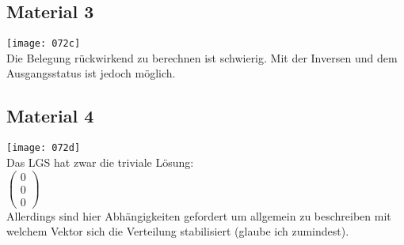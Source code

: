 \documentclass{article}
\begin{document}
	\subsection*{Material 3}
	\texttt{[image: 072c]} \\
	Die Belegung rückwirkend zu berechnen ist schwierig. Mit der Inversen und dem Ausgangsstatus ist jedoch möglich.
	\subsection*{Material 4}
	\texttt{[image: 072d]} \\
	Das LGS hat zwar die triviale Lösung: \\
	$\left(\begin{array}{c}
	0 \\ 0 \\ 0
	\end{array}\right)$ \\
	Allerdings sind hier Abhängigkeiten gefordert um allgemein zu beschreiben mit welchem Vektor sich die Verteilung stabilisiert (glaube ich zumindest).
\end{document}
